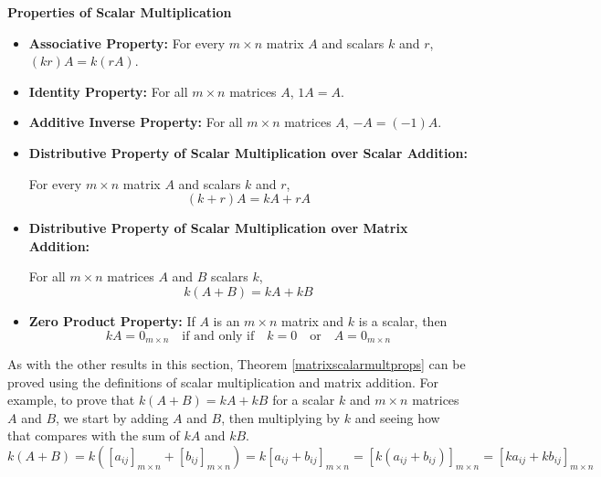 \documentclass{ximera}
\begin{document}
\smallskip
\begin{theorem}  \label{matrixscalarmultprops}\textbf{Properties of Scalar Multiplication}  

\begin{itemize}

\item  \textbf{Associative Property:}    For every  $m \times n$ matrix $A$ and scalars  $k$ and $r$, $(kr)A = k(rA)$.

\item  \textbf{Identity Property:}   For all $m \times n$ matrices $A$, $1A = A$.

\item  \textbf{Additive Inverse Property:} For all $m \times n$ matrices $A$, $-A = (-1)A$.  

\item  \textbf{Distributive Property of Scalar Multiplication over Scalar Addition:}    

For every  $m \times n$ matrix $A$ and scalars  $k$ and $r$, \[(k+r)A = kA + rA\]

\item  \textbf{Distributive Property of Scalar Multiplication over Matrix Addition:}

 For all $m \times n$ matrices $A$ and $B$ scalars $k$, \[k(A+B) = kA + kB\] 

\item  \textbf{Zero Product Property:}   If $A$ is an $m \times n$ matrix and $k$ is a scalar, then 
\[kA = 0_{m \times n} \quad \text{if and only if} \quad k=0 \quad \text{or} \quad A = 0_{m \times n}\]


\end{itemize}

\end{theorem}
\smallskip

As with the other results in this section, Theorem \ref{matrixscalarmultprops} can be proved using the definitions of scalar multiplication and matrix addition.  For example, to prove that $k(A+B) = kA + kB$ for a scalar $k$ and $m \times n$ matrices $A$ and $B$, we start by adding $A$ and $B$, then multiplying by $k$ and seeing how that compares with the sum of $kA$ and $kB$. \[ k(A+B) = k \left(\left[a_{ij}\right]_{m \times n} + \left[b_{ij}\right]_{m \times n}\right) = k \left[a_{ij} + b_{ij} \right]_{m \times n} = \left[k \left(a_{ij}+b_{ij}\right)\right]_{m \times n} = \left[ka_{ij} + kb_{ij}\right]_{m \times n}\]
\end{document}
